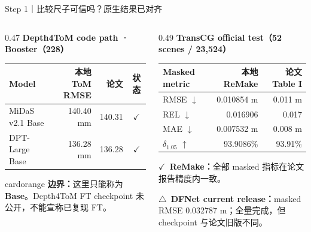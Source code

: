 \documentclass{beamer}
\newcommand{\ok}{\textcolor{good}{\ensuremath{\checkmark}}}
\newcommand{\caution}{\textcolor{warn}{\ensuremath{\triangle}}}
\newcommand{\cardtitle}[1]{\textcolor{maincolor}{\bfseries #1}}
\begin{document}
\begin{frame}{Step 1｜比较尺子可信吗？原生结果已对齐}
\vspace{-0.5em}
\begin{columns}[T,onlytextwidth]
  \begin{column}{0.47\textwidth}
    \cardtitle{Depth4ToM code path · Booster（228）}

    \vspace{0.35em}
    \renewcommand{\arraystretch}{1.35}
    \scriptsize
    \begin{tabularx}{\linewidth}{@{}Xrrc@{}}
      \toprule
      Model & 本地 ToM RMSE & 论文 & 状态 \\
      \midrule
      MiDaS v2.1 Base & 140.40 mm & 140.31 & \ok \\
      DPT-Large Base  & 136.28 mm & 136.28 & \ok \\
      \bottomrule
    \end{tabularx}

    \vspace{0.7em}
    \begin{beamercolorbox}[wd=\linewidth,sep=0.65em,rounded=true]{cardorange}
      \scriptsize
      \textbf{边界：}这里只能称为 \textbf{Base}。Depth4ToM FT checkpoint 未公开，不能宣称已复现 FT。
    \end{beamercolorbox}
  \end{column}
  \begin{column}{0.49\textwidth}
    \cardtitle{TransCG official test（52 scenes / 23,524）}

    \vspace{0.35em}
    \renewcommand{\arraystretch}{1.24}
    \scriptsize
    \begin{tabularx}{\linewidth}{@{}Xrr@{}}
      \toprule
      Masked metric & 本地 ReMake & 论文 Table I \\
      \midrule
      RMSE $\downarrow$ & 0.010854 m & 0.011 m \\
      REL $\downarrow$  & 0.016906 & 0.017 \\
      MAE $\downarrow$  & 0.007532 m & 0.008 m \\
      $\delta_{1.05}$ $\uparrow$ & 93.9086\% & 93.91\% \\
      \bottomrule
    \end{tabularx}

    \vspace{0.55em}
    \scriptsize
    \ok\ \textbf{ReMake：}全部 masked 指标在论文报告精度内一致。

    \vspace{0.2em}
    \caution\ \textbf{DFNet current release：}masked RMSE 0.032787 m；全量完成，但 checkpoint 与论文旧版不同。
  \end{column}
\end{columns}


\end{frame}
\end{document}
